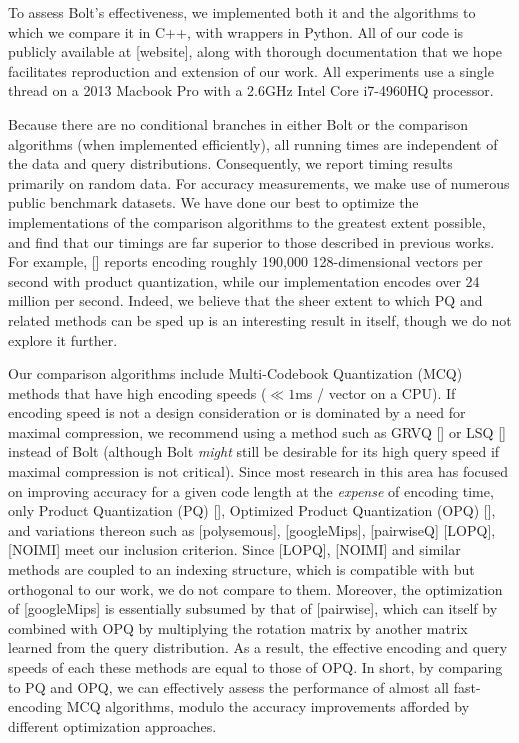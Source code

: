 
To assess Bolt's effectiveness, we implemented both it and the algorithms to which we compare it in C++, with wrappers in Python. All of our code is publicly available at [website], along with thorough documentation that we hope facilitates reproduction and extension of our work. All experiments use a single thread on a 2013 Macbook Pro with a 2.6GHz Intel Core i7-4960HQ processor.

Because there are no conditional branches in either Bolt or the comparison algorithms (when implemented efficiently), all running times are independent of the data and query distributions. Consequently, we report timing results primarily on random data. For accuracy measurements, we make use of numerous public benchmark datasets. We have done our best to optimize the implementations of the comparison algorithms to the greatest extent possible, and find that our timings are far superior to those described in previous works. For example, [] reports encoding roughly 190,000 128-dimensional vectors per second with product quantization, while our implementation encodes over 24 million per second. Indeed, we believe that the sheer extent to which PQ and related methods can be sped up is an interesting result in itself, though we do not explore it further.

Our comparison algorithms include Multi-Codebook Quantization (MCQ) methods that have high encoding speeds ($\ll 1$ms / vector on a CPU). If encoding speed is not a design consideration or is dominated by a need for maximal compression, we recommend using a method such as GRVQ [] or LSQ [] instead of Bolt (although Bolt \textit{might} still be desirable for its high query speed if maximal compression is not critical). Since most research in this area has focused on improving accuracy for a given code length at the \textit{expense} of encoding time, only Product Quantization (PQ) [], Optimized Product Quantization (OPQ) [], and variations thereon such as [polysemous], [googleMips], [pairwiseQ] [LOPQ], [NOIMI] meet our inclusion criterion. Since [LOPQ], [NOIMI] and similar methods are coupled to an indexing structure, which is compatible with but orthogonal to our work, we do not compare to them. Moreover, the optimization of [googleMips] is essentially subsumed by that of [pairwise], which can itself by combined with OPQ by multiplying the rotation matrix by another matrix learned from the query distribution. As a result, the effective encoding and query speeds of each these methods are equal to those of OPQ. In short, by comparing to PQ and OPQ, we can effectively assess the performance of almost all fast-encoding MCQ algorithms, modulo the accuracy improvements afforded by different optimization approaches.

